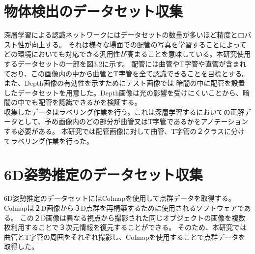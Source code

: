 \section{物体検出のデータセット収集}
深層学習による認識ネットワークにはデータセットの数量が多いほど精度とロバスト性が向上する。
それは様々な場面での配管の写真を学習することによってどの環境においても対応できる汎用性が高まることを意味している。本研究使用するデータセットの一部を図3.2に示す。
配管には曲管やT字管や直管が含まれており、この画像内の中から曲管とT字管を全て認識できることを目標とする。また、Depth画像の有効性を示すためにテスト画像では
暗闇の中に配管を設置したデータセットを用意した。Depth画像は光の影響を受けにくいことから、暗闇の中でも配管を認識できるかを検証する。\\
収集したデータはラベリング作業を行う。これは深層学習するにおいての正解データとして、予め画像内のどの部分が曲管又はT字管であるかをアノテーションする必要がある。
本研究では配管画像に対して曲管、T字管の２クラスに分けてラベリング作業を行った。


\section{6D姿勢推定のデータセット収集}
6D姿勢推定のデータセットにはColmapを使用して点群データを取得する。Colmapは２D画像から３D点群を再構築するために使用されるソフトウェアである。
この２D画像は異なる視点から撮影された同じオブジェクトの画像を複数枚利用することで３次元情報を復元することができる。
そのため、本研究では曲管とT字管の周囲をそれぞれ撮影し、Colmapを使用することで点群データを取得した。

